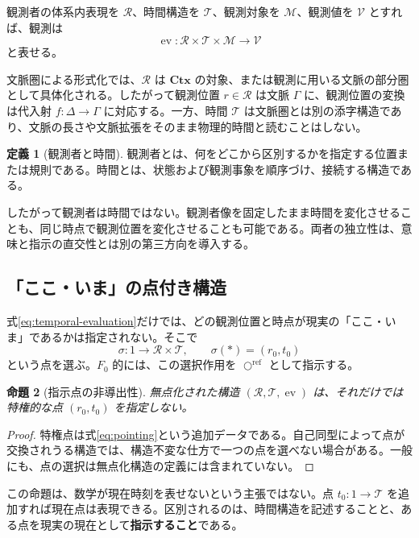 \documentclass[a4paper,11pt]{ltjsarticle}
\theoremstyle{definition}
\newtheorem{definition}{定義}[section]
\theoremstyle{plain}
\newtheorem{proposition}[definition]{命題}
\newcommand{\CircleRef}{\bigcirc^{\mathrm{ref}}}
\newcommand{\Obj}{\mathcal M}
\newcommand{\Obs}{\mathcal R}
\newcommand{\Time}{\mathcal T}
\newcommand{\Val}{\mathcal V}
\newcommand{\Ctx}{\mathbf{Ctx}}
\begin{document}
観測者の体系内表現を $\Obs$、時間構造を $\Time$、観測対象を $\Obj$、観測値を $\Val$ とすれば、観測は
\begin{equation}
\operatorname{ev}:\Obs\times\Time\times\Obj
 \longrightarrow\Val
 \label{eq:temporal-evaluation}
\end{equation}
と表せる。

文脈圏による形式化では、$\Obs$ は $\Ctx$ の対象、または観測に用いる文脈の部分圏として具体化される。したがって観測位置 $r\in\Obs$ は文脈 $\Gamma$ に、観測位置の変換は代入射 $f:\Delta\to\Gamma$ に対応する。一方、時間 $\Time$ は文脈圏とは別の添字構造であり、文脈の長さや文脈拡張をそのまま物理的時間と読むことはしない。

\begin{definition}[観測者と時間]
観測者とは、何をどこから区別するかを指定する位置または規則である。時間とは、状態および観測事象を順序づけ、接続する構造である。
\end{definition}

したがって観測者は時間ではない。観測者像を固定したまま時間を変化させることも、同じ時点で観測位置を変化させることも可能である。両者の独立性は、意味と指示の直交性とは別の第三方向を導入する。

\subsection{「ここ・いま」の点付き構造}

式\eqref{eq:temporal-evaluation}だけでは、どの観測位置と時点が現実の「ここ・いま」であるかは指定されない。そこで
\begin{equation}
 \sigma:1\longrightarrow\Obs\times\Time,
 \qquad
 \sigma(*)=(r_0,t_0)
 \label{eq:pointing}
\end{equation}
という点を選ぶ。$F_0$ 的には、この選択作用を $\CircleRef$ として指示する。

\begin{proposition}[指示点の非導出性]
無点化された構造 $(\Obs,\Time,\operatorname{ev})$ は、それだけでは特権的な点 $(r_0,t_0)$ を指定しない。
\end{proposition}

\begin{proof}
特権点は式\eqref{eq:pointing}という追加データである。自己同型によって点が交換されうる構造では、構造不変な仕方で一つの点を選べない場合がある。一般にも、点の選択は無点化構造の定義には含まれていない。
\end{proof}

この命題は、数学が現在時刻を表せないという主張ではない。点 $t_0:1\to\Time$ を追加すれば現在点は表現できる。区別されるのは、時間構造を記述することと、ある点を現実の現在として\textbf{指示すること}である。
\end{document}

